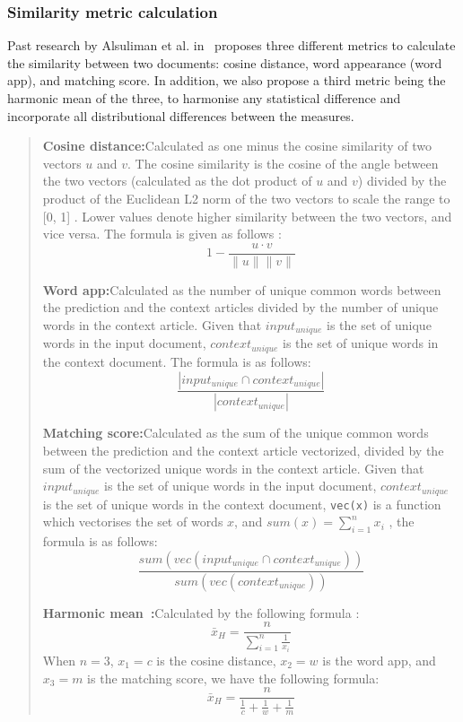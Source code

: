 \documentclass{article}
\begin{document}
\subsubsection{Similarity metric calculation} \label{section:similarity-metric}
Past research by Alsuliman et al. in~\cite{alsuliman2022social} proposes three different metrics to calculate the similarity between two documents: cosine distance, word appearance (word app), and matching score. In addition, we also propose a third metric being the harmonic mean of the three, to harmonise any statistical difference and incorporate all distributional differences between the measures.

\begin{quote}
  \textbf{Cosine distance:}\quad Calculated as one minus the cosine similarity of two vectors $u$ and $v$. The cosine similarity is the cosine of the angle between the two vectors (calculated as the dot product of $u$ and $v$) divided by the product of the Euclidean L2 norm of the two vectors to scale the range to [0, 1] \cite{scikit-learn}. Lower values denote higher similarity between the two vectors, and vice versa. The formula is given as follows \cite{scipy}:
  \[ 1 - \frac{u \cdot v}{\lVert u \rVert \lVert v \rVert}\]

  \textbf{Word app:}\quad Calculated as the number of unique common words between the prediction and the context articles divided by the number of unique words in the context article. Given that \texttt{$input_{unique}$} is the set of unique words in the input document, \texttt{$context_{unique}$} is the set of unique words in the context document. The formula is as follows:
  \[\frac{\left|input_{unique} \cap context_{unique}\right|}{\left|context_{unique}\right|}\]

  \textbf{Matching score:}\quad Calculated as the sum of the unique common words between the prediction and the context article vectorized, divided by the sum of the vectorized unique words in the context article. Given that \texttt{$input_{unique}$} is the set of unique words in the input document, \texttt{$context_{unique}$} is the set of unique words in the context document, \texttt{vec(x)} is a function which vectorises the set of words $x$, and $sum(x) = \sum_{i=1}^n x_i$ , the formula is as follows:
  \[\frac{sum(vec(input_{unique} \cap context_{unique}))}{sum(vec(context_{unique}))}\]

  \textbf{Harmonic mean~\cite{harmonic_mean}:}\quad Calculated by the following formula :
  \[\bar{x}_H = \frac{n}{\sum^n_{i=1}\frac{1}{x_i}}\]
  When $n = 3$, $x_1 = c$ is the cosine distance, $x_2 = w$ is the word app, and $x_3 = m$ is the matching score, we have the following formula:
  \[\bar{x}_H = \frac{n}{\frac{1}{c} + \frac{1}{w} + \frac{1}{m}}\]
\end{quote}
\end{document}
